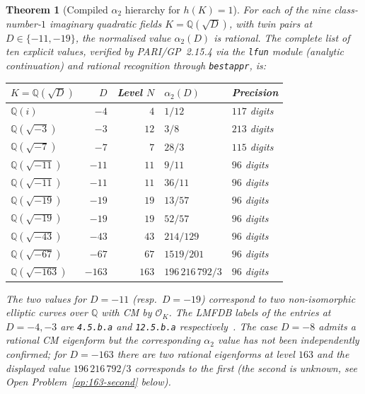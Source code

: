 \documentclass[12pt]{amsart}
\newtheorem{theorem}{Theorem}[section]
\theoremstyle{definition}
\newcommand{\Q}{\mathbb{Q}}
\newcommand{\OK}{\mathcal{O}_K}
\begin{document}
\begin{theorem}[Compiled $\alpha_2$ hierarchy for $h(K)=1$]\label{thm:hierarchy}
For each of the nine class-number-$1$ imaginary quadratic fields
$K = \Q(\sqrt{D})$, with twin pairs at $D \in \{-11,-19\}$, the
normalised value $\alpha_2(D)$ is rational. The complete list of
ten explicit values, verified by PARI/GP~2.15.4 \cite{PARI215} via
the \texttt{lfun} module (analytic continuation) and rational
recognition through \texttt{bestappr}, is:

\begin{center}
\renewcommand{\arraystretch}{1.30}
\begin{tabular}{lrrll}
\toprule
$K = \Q(\sqrt{D})$ & $D$ & Level $N$ & $\alpha_2(D)$ & Precision \\
\midrule
$\Q(i)$            & $-4$   & $4$    & $1/12$            & $117$ digits \\
$\Q(\sqrt{-3})$    & $-3$   & $12$   & $3/8$             & $213$ digits \\
$\Q(\sqrt{-7})$    & $-7$   & $7$    & $28/3$            & $115$ digits \\
$\Q(\sqrt{-11})$   & $-11$  & $11$   & $9/11$            & $96$  digits \\
$\Q(\sqrt{-11})$   & $-11$  & $11$   & $36/11$           & $96$  digits \\
$\Q(\sqrt{-19})$   & $-19$  & $19$   & $13/57$           & $96$  digits \\
$\Q(\sqrt{-19})$   & $-19$  & $19$   & $52/57$           & $96$  digits \\
$\Q(\sqrt{-43})$   & $-43$  & $43$   & $214/129$         & $96$  digits \\
$\Q(\sqrt{-67})$   & $-67$  & $67$   & $1519/201$        & $96$  digits \\
$\Q(\sqrt{-163})$  & $-163$ & $163$  & $196\,216\,792/3$ & $96$  digits \\
\bottomrule
\end{tabular}
\end{center}

The two values for $D = -11$ (resp.\ $D = -19$) correspond to two
non-isomorphic elliptic curves over $\Q$ with CM by $\OK$. The
LMFDB labels of the entries at $D = -4, -3$ are \texttt{4.5.b.a} and
\texttt{12.5.b.a} respectively~\cite{LMFDB2026}. The case
$D = -8$ admits a rational CM eigenform but the corresponding $\alpha_2$
value has not been independently confirmed; for $D = -163$ there are
two rational eigenforms at level $163$ and the displayed value
$196\,216\,792/3$ corresponds to the first (the second is unknown,
see Open Problem~\ref{op:163-second} below).
\end{theorem}
\end{document}
